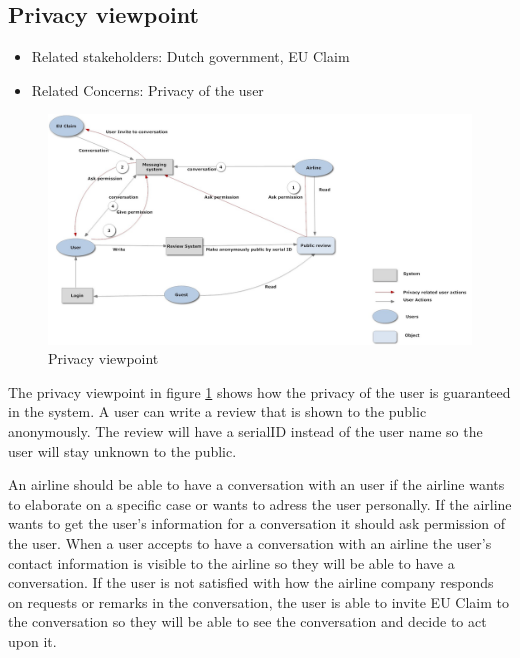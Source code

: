 % 

\subsection{Privacy viewpoint}

\begin{itemize}
\item Related stakeholders: Dutch government, EU Claim
\item Related Concerns: Privacy of the user
\end{itemize}

\newpage
\begin{landscape}
\begin{figure}
\includegraphics[width=680px]{privacyview}
\caption{Privacy viewpoint}
\label{fig:privacy}
\end{figure}
\end{landscape}
The privacy viewpoint in figure \ref{fig:privacy} shows how the privacy of the user is guaranteed in the system. A user can write a review that is shown to the public anonymously. The review will have a serialID instead of the user name so the user will stay unknown to the public. 

An airline should be able to have a conversation with an user if the airline wants to elaborate on a specific case or wants to adress the user personally. If the airline wants to get the user's information for a conversation it should ask permission of the user. When a user accepts to have a conversation with an airline the user's contact information is visible to the airline so they will be able to have a conversation. If the user is not satisfied with how the airline company responds on requests or remarks in the conversation, the user is able to invite EU Claim to the conversation so they will be able to see the conversation and decide to act upon it.